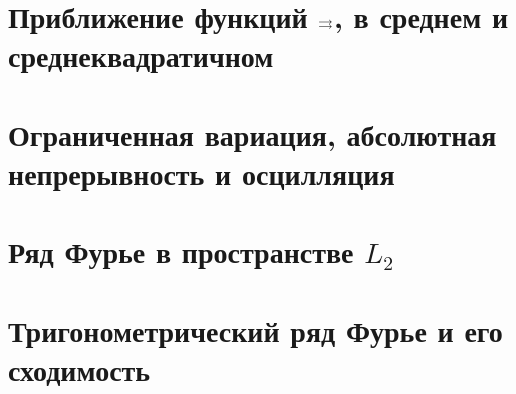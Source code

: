 

\section{Приближение функций \texorpdfstring{$\rightrightarrows$}{равномерно}, в среднем и среднеквадратичном}

 
 
 
 
 


\section{Ограниченная вариация, абсолютная непрерывность и осцилляция}










\section{Ряд Фурье в пространстве \texorpdfstring{$L_2$}{L2}}
 
 
 
 


\section{Тригонометрический ряд Фурье и его сходимость}
 
 
 
 
 
 
 



%  
%  
